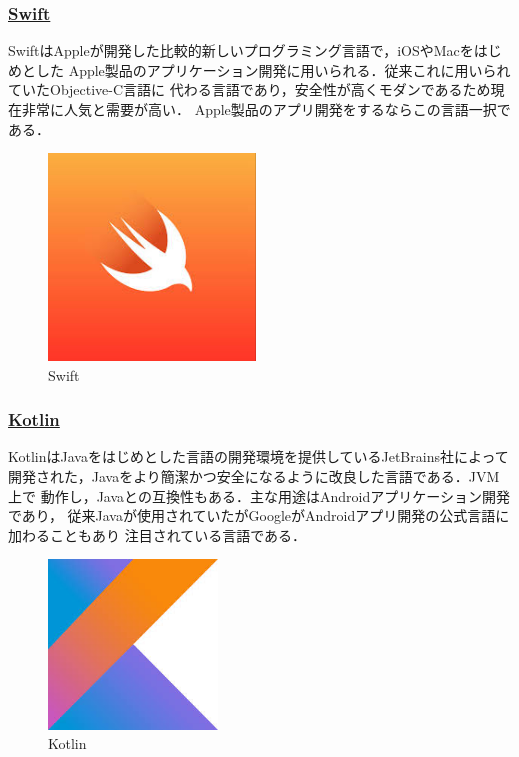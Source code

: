 \documentclass[autodetect-engine,dvi=dvipdfmx,ja=standard,a4j]{bxjsarticle}
\begin{document}
\subsubsection*{\underline{\textbf{Swift}}}
SwiftはAppleが開発した比較的新しいプログラミング言語で，iOSやMacをはじめとした
Apple製品のアプリケーション開発に用いられる．従来これに用いられていたObjective-C言語に
代わる言語であり，安全性が高くモダンであるため現在非常に人気と需要が高い．
Apple製品のアプリ開発をするならこの言語一択である．

\begin{figure}[H]
    \centering
    \includegraphics[width=55mm]{image/Swift.png}
    \caption*{Swift}
    \label{fig:swift}
\end{figure}

\subsubsection*{\underline{\textbf{Kotlin}}}
KotlinはJavaをはじめとした言語の開発環境を提供しているJetBrains社によって
開発された，Javaをより簡潔かつ安全になるように改良した言語である．JVM上で
動作し，Javaとの互換性もある．主な用途はAndroidアプリケーション開発であり，
従来Javaが使用されていたがGoogleがAndroidアプリ開発の公式言語に加わることもあり
注目されている言語である．

\begin{figure}[H]
    \centering
    \includegraphics[width=45mm]{image/Kotlin.png}
    \caption*{Kotlin}
    \label{fig:kotlin}
\end{figure}
\end{document}
